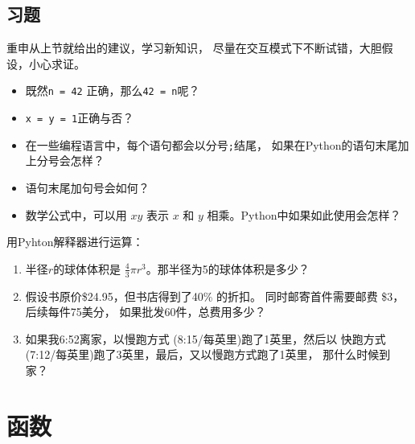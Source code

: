 \documentclass[10pt]{book}
\begin{document}
\section{习题}

\begin{exercise}

重申从上节就给出的建议，学习新知识，
尽量在交互模式下不断试错，大胆假设，小心求证。

\begin{itemize}

\item 既然{\tt n = 42} 正确，那么{\tt 42 = n}呢？

\item {\tt x = y = 1}正确与否？

\item 在一些编程语言中，每个语句都会以分号{\tt ;}结尾，
如果在Python的语句末尾加上分号会怎样？

\item 语句末尾加句号会如何？

\item 数学公式中，可以用 $x y$ 表示 $x$ 和 $y$ 相乘。Python中如果如此使用会怎样？

\end{itemize}

\end{exercise}


\begin{exercise}

用Pyhton解释器进行运算： 

\begin{enumerate}

\item 半径$r$的球体体积是 $\frac{4}{3} \pi r^3$。那半径为5的球体体积是多少？

\item 假设书原价\$24.95，但书店得到了40\% 的折扣。
同时邮寄首件需要邮费 \$3，后续每件75美分，
如果批发60件，总费用多少？

\item 如果我6:52离家，以慢跑方式 (8:15/每英里)跑了1英里，然后以
快跑方式(7:12/每英里)跑了3英里，最后，又以慢跑方式跑了1英里，
那什么时候到家？

\end{enumerate}
\end{exercise}


\chapter{函数}
\label{funcchap}
\end{document}
